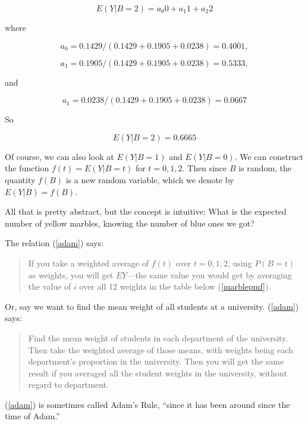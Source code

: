 \begin{equation}
E(Y | B = 2) = a_0 0 + a_1 1 + a_2 2
\end{equation}

where

\begin{equation}
a_0 = 0.1429 / (0.1429+0.1905+0.0238) = 0.4001,
\end{equation}

\begin{equation}
a_1 = 0.1905 / (0.1429+0.1905+0.0238) = 0.5333,
\end{equation}

and

\begin{equation}
a_1 = 0.0238 / (0.1429+0.1905+0.0238) = 0.0667
\end{equation}

So 

\begin{equation}
E(Y | B = 2) = 0.6665
\end{equation}

Of course, we can also look at $E(Y | B = 1)$ and $E(Y | B = 0)$.  We
can construct the function $f(t) = E(Y | B = t)$ for $t = 0,1,2$.  Then
since $B$ is random, the quantity $f(B)$ is a new random variable,
which we denote by $E(Y | B) = f(B)$.

All that is pretty abstract, but the concept is intuitive:  What is the
expected number of yellow marbles, knowing the number of blue ones we
got?

The relation (\ref{adam}) says:

\begin{quote}
If you take a weighted average of $f(t)$ over $t=0,1,2$, using $P(B = t)$
as weights, you will get $EY$---the same value you would get by
averaging the value of $i$ over all 12 weights in the table below
(\ref{marblepmf}).
\end{quote}

Or, say we want to find the mean weight of all students at a university.
(\ref{adam}) says:

\begin{quote}
Find the mean weight of students in each department of the university.
Then take the weighted average of those means, with weights being each
department's proportion in the university.  Then you will get the same
result if you averaged all the student weights in the university,
without regard to department.
\end{quote}

(\ref{adam}) is sometimes called Adam's Rule, ``since it has been around
since the time of Adam.''


